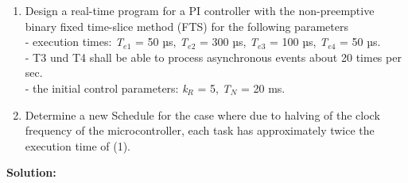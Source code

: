 \begin{enumerate}
\item Design a real-time program for a PI controller with the non-preemptive binary fixed time-slice method (FTS) for the following parameters \\- execution times: \textit{T}${}_{e1}$ = 50 µs, \textit{T}${}_{e2}$ = 300 µs, \textit{T}${}_{e3}$ = 100 µs, \textit{T}${}_{e4}$ = 50 µs.\\ - T3 und T4 shall be able to process asynchronous events about 20 times per sec.\\- the initial control parameters: \textit{k${}_{R}$} = 5, \textit{T${}_{N}$} = 20 ms.
\item Determine a new Schedule for the case where due to halving of the clock frequency of the microcontroller, each task has approximately twice the execution time of (1).
\end{enumerate}

\textbf{Solution:}

